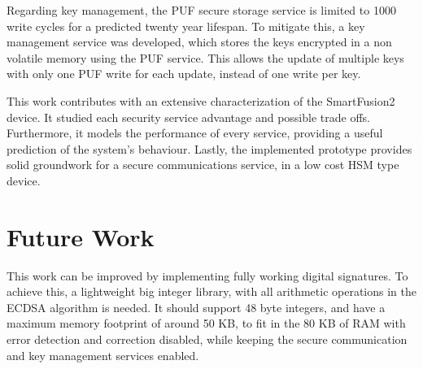 Regarding key management, the PUF secure storage service is limited to 1000 write cycles for a predicted twenty year lifespan. To mitigate this, a key management service was developed, which stores the keys encrypted in a non volatile memory using the PUF service. This allows the update of multiple keys with only one PUF write for each update, instead of one write per key.

This work contributes with an extensive characterization of the SmartFusion2 device. It studied each security service advantage and possible trade offs. Furthermore, it models the performance of every service, providing a useful prediction of the system's behaviour. Lastly, the implemented prototype provides solid groundwork for a secure communications service, in a low cost HSM type device.

\section{Future Work} \label{chap:conclusion:future-work}

This work can be improved by implementing fully working digital signatures. To achieve this, a lightweight big integer library, with all arithmetic operations in the ECDSA algorithm is needed. It should support 48 byte integers, and have a maximum memory footprint of around 50 KB, to fit in the 80 KB of RAM with error detection and correction disabled, while keeping the secure communication and key management services enabled.
